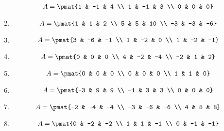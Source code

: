 \begin{enumerate}
\begin{align*}
A = \pmat{1 & -1 & 4 \\ 1 & -1 & 3 \\ 0 & 0 & 0}
\end{align*}

\item

\begin{align*}
A = \pmat{1 & 1 & 2 \\ 5 & 5 & 10 \\ -3 & -3 & -6}
\end{align*}

\item

\begin{align*}
A = \pmat{3 & -6 & -1 \\ 1 & -2 & 0 \\ 1 & -2 & -1}
\end{align*}

\item

\begin{align*}
A = \pmat{0 & 0 & 0 \\ 4 & -2 & -4 \\ -2 & 1 & 2}
\end{align*}

\item

\begin{align*}
A = \pmat{0 & 0 & 0 \\ 0 & 0 & 0 \\ 1 & 1 & 0}
\end{align*}

\item

\begin{align*}
A = \pmat{-3 & 9 & 9 \\ -1 & 3 & 3 \\ 0 & 0 & 0}
\end{align*}

\item

\begin{align*}
A = \pmat{-2 & -4 & -4 \\ -3 & -6 & -6 \\ 4 & 8 & 8}
\end{align*}

\item

\begin{align*}
A = \pmat{0 & -2 & -2 \\ 1 & 1 & -1 \\ 0 & -1 & -1}
\end{align*}


\end{enumerate}

